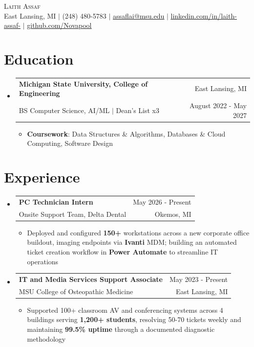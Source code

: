 \documentclass[letterpaper,11pt]{article}
\makeatletter
\newcommand{\resumeItem}[1]{
  \item\small{
    {#1 \vspace{-2pt}}
  }
}
\newcommand{\resumeSubheading}[4]{
  \vspace{-2pt}\item
    \begin{tabular*}{0.97\textwidth}[t]{l@{\extracolsep{\fill}}r}
      \textbf{#1} & \small #2 \\
      \small#3 & \small #4 \\
    \end{tabular*}\vspace{-7pt}
}
\newcommand{\resumeSubHeadingListStart}{\begin{itemize}[leftmargin=0.15in, label={}]}
\newcommand{\resumeSubHeadingListEnd}{\end{itemize}}
\newcommand{\resumeItemListStart}{\begin{itemize}}
\newcommand{\resumeItemListEnd}{\end{itemize}\vspace{-5pt}}
\makeatother
\begin{document}
\begin{center}
    {\Huge \scshape Laith Assaf} \\ \vspace{1pt}
    \small East Lansing, MI $|$ (248) 480-5783 $|$ \href{mailto:assaflai@msu.edu}{\underline{assaflai@msu.edu}} $|$ \href{https://linkedin.com/in/laith-assaf-}{\underline{linkedin.com/in/laith-assaf-}} $|$ \href{https://github.com/Novapool}{\underline{github.com/Novapool}}
\end{center}
\section{Education}
  \resumeSubHeadingListStart
    \resumeSubheading
      {Michigan State University, College of Engineering}{East Lansing, MI}
      {BS Computer Science, AI/ML $|$ Dean's List x3}{August 2022 - May 2027}
      \resumeItemListStart
        \resumeItem{\textbf{Coursework}: Data Structures \& Algorithms, Databases \& Cloud Computing, Software Design}
      \resumeItemListEnd
  \resumeSubHeadingListEnd

\section{Experience}
  \resumeSubHeadingListStart
    \resumeSubheading
      {PC Technician Intern}{May 2026 - Present}
      {Onsite Support Team, Delta Dental}{Okemos, MI}
      \resumeItemListStart
        \resumeItem{Deployed and configured \textbf{150+} workstations across a new corporate office buildout, imaging endpoints via \textbf{Ivanti} MDM; building an automated ticket creation workflow in \textbf{Power Automate} to streamline IT operations}
      \resumeItemListEnd
    \resumeSubheading
      {IT and Media Services Support Associate}{May 2023 - Present}
      {MSU College of Osteopathic Medicine}{East Lansing, MI}
      \resumeItemListStart
        \resumeItem{Supported 100+ classroom AV and conferencing systems across 4 buildings serving \textbf{1,200+ students}, resolving 50-70 tickets weekly and maintaining \textbf{99.5\% uptime} through a documented diagnostic methodology}
      \resumeItemListEnd
  \resumeSubHeadingListEnd

\end{document}
